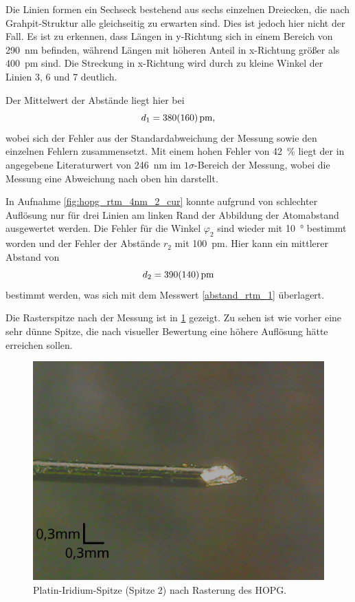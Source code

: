 Die Linien formen ein Sechseck bestehend aus sechs einzelnen Dreiecken, die nach Grahpit-Struktur alle 
gleichseitig zu erwarten sind. Dies ist jedoch hier nicht der Fall. Es ist zu erkennen, dass Längen 
in y-Richtung sich in einem Bereich von \SI{290}{\nm} befinden, während Längen mit höheren Anteil 
in x-Richtung größer als \SI{400}{\pm} sind. Die Streckung in x-Richtung wird durch zu kleine Winkel 
der Linien 3, 6 und 7 deutlich.\par 
Der Mittelwert der Abstände liegt hier bei 
\begin{equation}
	d_1 = \SI{380\pm 160}{\pm}, 
	\label{abstand_rtm_1}
\end{equation}
wobei sich der Fehler aus der Standardabweichung der Messung sowie den einzelnen Fehlern zusammensetzt. 
Mit einem hohen Fehler von \SI{42}{\percent} liegt der in \cite{skript} angegebene Literaturwert von 
\SI{246}{\nm}
im $1\sigma$-Bereich der Messung, wobei die Messung eine Abweichung nach oben hin darstellt.\\\par 

In Aufnahme \ref{fig:hopg_rtm_4nm_2_cur} konnte aufgrund von schlechter Auflösung 
nur für drei Linien am linken Rand der Abbildung der Atomabstand ausgewertet werden. Die Fehler für 
die Winkel $\varphi_2$ sind wieder mit \SI{10}{\degree} bestimmt worden und der 
Fehler der Abstände $r_2$ mit \SI{100}{\pm}. Hier kann ein mittlerer Abstand von 
\begin{equation}
	d_2 = \SI{390\pm140}{\pm}
	\label{abstand_rtm_2}
\end{equation}
bestimmt werden, was sich mit dem Messwert \ref{abstand_rtm_1} überlagert.



Die Rasterspitze nach der Messung ist in \cref{fig:spitze_hopg_nachher} gezeigt. Zu sehen ist 
wie vorher eine sehr dünne Spitze, die nach visueller Bewertung eine höhere Auflösung hätte erreichen sollen.

\begin{figure}[htb]
	\centering
	\includegraphics[width=0.5\linewidth]{figs/spitze_hopg_nachher_v2}
	\caption{Platin-Iridium-Spitze (Spitze 2) nach Rasterung des HOPG.}
	\label{fig:spitze_hopg_nachher}
\end{figure}
